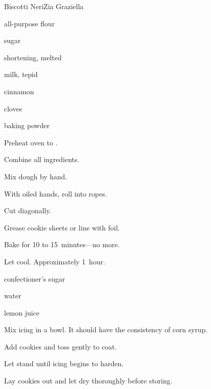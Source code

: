 \begin{recipe}{Biscotti Neri}{Zia Graziella}{}

\begin{ingredients}
\item {} all-purpose flour
\item {} sugar
\item \lbs{\half} shortening, melted
\item {} milk, tepid
\item {} 
\item {} cinnamon
\item {} cloves
\item {} baking powder
\end{ingredients}

\begin{directions}
\item Preheat oven to .
\item Combine all ingredients.
\item Mix dough by hand.
\item With oiled hands, roll into ropes.
\item Cut diagonally.
\item Grease cookie sheets or line with foil.
\item Bake for 10 to 15~minutes---no more.
\item Let cool. Approximately 1~hour.
\end{directions}


\begin{ingredients}
\item confectioner's sugar
\item water
\item lemon juice
\end{ingredients}

\begin{directions}
\item Mix icing in a bowl. It should have the consistency of corn syrup.
\item Add cookies and toss gently to coat.
\item Let stand until icing begins to harden.
\item Lay cookies out and let dry thoroughly before storing.
\end{directions}

\end{recipe}

